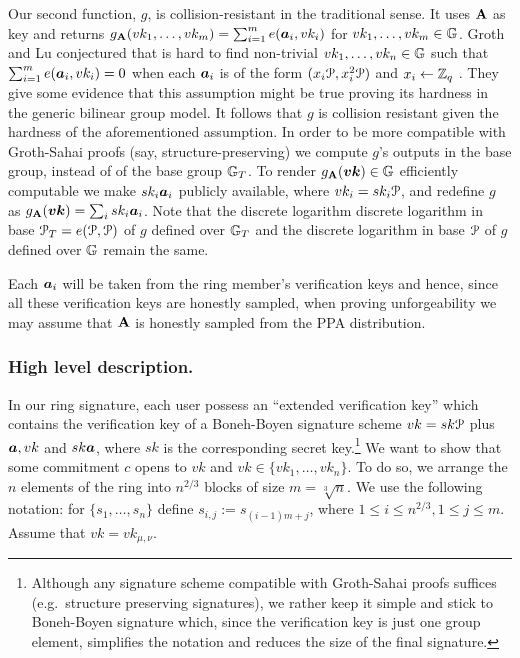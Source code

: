 Our second function, $g$, is collision-resistant in the traditional sense. It uses $\mathbf{{A}}$ as key and returns $g_{\mathbf{{A}}}(vk_1,\ldots,vk_m) = \sum_{i=1}^m e({\boldsymbol{a}}_i,vk_i)$ for $vk_1,\ldots,vk_m\in\mathbb{G}$.  Groth and Lu conjectured that is hard to find non-trivial $vk_1,\ldots,vk_n\in\mathbb{G}$ such that $\sum_{i=1}^m e({\boldsymbol{a}}_i,vk_i)=0$ when each ${\boldsymbol{a}}_i$ is of the form $(x_i\mathcal{P},x_i^2\mathcal{P})$ and $x_i\gets\mathbb{Z}_q$ \cite{AC:GroLu07}. They give some evidence that this assumption might be true proving its hardness in the generic bilinear group model. It follows that $g$ is collision resistant given the hardness of the aforementioned assumption. In order to be more compatible with Groth-Sahai proofs (say, structure-preserving) we compute $g$'s outputs in the base group, instead of of the base group $\mathbb{G}_T$. To render $g_{\mathbf{{A}}}({\boldsymbol{vk}})\in\mathbb{G}$ efficiently computable we make $sk_i{\boldsymbol{a}}_i$ publicly available, where $vk_i = sk_i\mathcal{P}$, and redefine $g$ as $g_{\mathbf{{A}}}({\boldsymbol{vk}}) = \sum_i sk_i{\boldsymbol{a}}_i$. Note that the discrete logarithm discrete logarithm in base $\mathcal{P}_T = e(\mathcal{P},\mathcal{P})$ of $g$ defined over $\mathbb{G}_T$ and the discrete logarithm in base $\mathcal{P}$ of $g$ defined over $\mathbb{G}$ remain the same.

Each ${\boldsymbol{a}}_i$ will be taken from the ring member's verification keys and hence, since all these verification keys are honestly sampled, when proving unforgeability we may assume that $\mathbf{{A}}$ is honestly sampled from the PPA distribution. %

\subsubsection{High level description.}
In our ring signature, each user possess an ``extended verification key'' which contains the verification key of a Boneh-Boyen signature scheme $vk = sk\mathcal{P}$ plus  ${\boldsymbol{a}},vk$ and $sk{\boldsymbol{a}}$, where $sk$ is the corresponding secret key.\footnote{Although any signature scheme compatible with Groth-Sahai proofs suffices (e.g.~structure preserving signatures), we rather keep it simple and stick to Boneh-Boyen signature which, since the verification key is just one group element, simplifies the notation and reduces the size of the final signature.} We want to show that some commitment $c$ opens to $vk$ and $vk\in\{vk_1,\ldots,vk_n\}$. To do so, we arrange the $n$ elements of the ring into $n^{2/3}$ blocks of size $m=\sqrt[3]{n}$. We use the following notation: for $\{s_1,\ldots, s_n\}$ define $s_{i,j}:=s_{(i-1)m+j}$, where  $1\leq i \leq n^{2/3},1\leq  j \leq m$. Assume that $vk = vk_{\mu,\nu}$.

